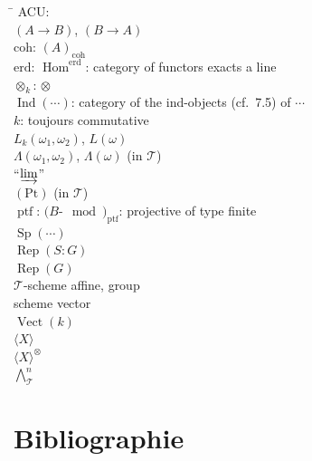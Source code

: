 \documentclass[12pt,a4paper]{article}
\theoremstyle{plain}
\theoremstyle{definition}
\DeclareMathOperator{\Sp}{Sp}
\DeclareMathOperator{\Hom}{Hom}
\DeclareMathOperator{\Rep}{Rep}
\DeclareMathOperator{\Vect}{Vect}
\DeclareMathOperator{\Ind}{Ind}
\DeclareMathOperator{\ptf}{ptf}
\newcommand{\coh}{\mathrm{coh}}
\newcommand{\eed}{\text{erd}}
\begin{document}
\begin{tabbing}
\hspace{3cm} \= \kill
ACU:  \\[4pt]
$(A \to B)$, $(B \to A)$  \\
$\coh$: $(A)_{\coh}$  \\[4pt]
$\eed$: $\Hom^{\eed}$: category of functors exacts a line  \\
$\otimes_k$: $\otimes$  \\[4pt]
$\Ind(\cdots)$: category of the ind-objects (cf.~7.5) of $\cdots$ \>  \\
$k$: toujours commutative \\[4pt]
$L_k(\omega_1, \omega_2)$, $L(\omega)$  \\
$\Lambda(\omega_1, \omega_2)$, $\Lambda(\omega)$ (in $\mathcal{T}$)  \\
``$\varinjlim$''  \\[4pt]
$(\mathrm{Pt})$ (in $\mathcal{T}$)  \\
$\ptf$: $(B\text{-}\mod)_{\ptf}$: projective of type finite  \\[4pt]
$\Sp(\cdots)$  \\
$\Rep(S : G)$  \\
$\Rep(G)$  \\[4pt]
$\mathcal{T}$-scheme affine, group  \\
scheme vector  \\
$\Vect(k)$  \\[4pt]
$\langle X \rangle$  \\
$\langle X \rangle^\otimes$  \\
$\bigwedge^n_\mathcal{T}$ 
\end{tabbing}

\section*{Bibliographie}
\end{document}
